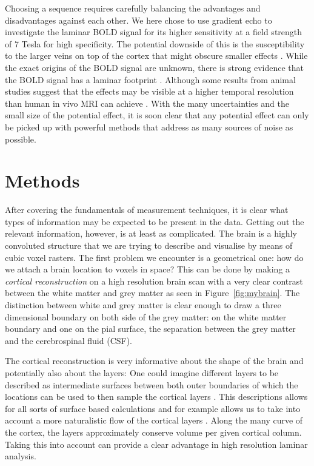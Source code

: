 Choosing a sequence requires carefully balancing the advantages and disadvantages against each other. We here chose to use gradient echo to investigate the laminar BOLD signal for its higher sensitivity at a field strength of 7 Tesla for high specificity. The potential downside of this is the susceptibility to the larger veins on top of the cortex that might obscure smaller effects \cite{Barth2007}. While the exact origins of the BOLD signal are unknown, there is strong evidence that the BOLD signal has a laminar footprint \cite{Logothetis2001}. Although some results from animal studies suggest that the effects may be visible at a higher temporal resolution than human in vivo MRI can achieve \cite{Yu2014,OHerron2016}. With the many uncertainties and the small size of the potential effect, it is soon clear that any potential effect can only be picked up with powerful methods that address as many sources of noise as possible. 

\section*{Methods}
After covering the fundamentals of measurement techniques, it is clear what types of information may be expected to be present in the data. Getting out the relevant information, however, is at least as complicated. The brain is a highly convoluted structure that we are trying to describe and visualise by means of cubic voxel rasters. The first problem we encounter is a geometrical one: how do we attach a brain location to voxels in space? This can be done by making a \emph{cortical reconstruction} on a high resolution brain scan \cite{Dale1999,Bazin2012} with a very clear contrast between the white matter and grey matter as seen in Figure~\ref{fig:mybrain}. The distinction between white and grey matter is clear enough to draw a three dimensional boundary on both side of the grey matter: on the white matter boundary and one on the pial surface, the separation between the grey matter and the cerebrospinal fluid (CSF).


The cortical reconstruction is very informative about the shape of the brain and potentially also about the layers: One could imagine different layers to be described as intermediate surfaces between both outer boundaries of which the locations can be used to then sample the cortical layers \cite{Koopmans2011,Polimeni2010,DeMartino2013}.
This descriptions allows for all sorts of surface based calculations \cite{Fischl2000,Bazin2012} and for example allows us to take into account a more naturalistic flow of the cortical layers \cite{Bok1929,Waehnert2014}. Along the many curve of the cortex, the layers approximately conserve volume per given cortical column. Taking this into account can provide a clear advantage in high resolution laminar analysis. 


